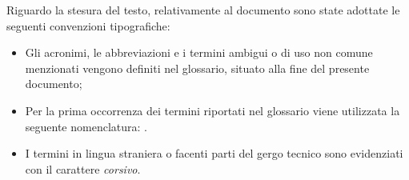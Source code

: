 


Riguardo la stesura del testo, relativamente al documento sono state adottate le seguenti convenzioni tipografiche:
\begin{itemize}
	\item Gli acronimi, le abbreviazioni e i termini ambigui o di uso non comune menzionati vengono definiti nel glossario, situato alla fine del presente documento;
	\item Per la prima occorrenza dei termini riportati nel glossario viene utilizzata la seguente nomenclatura: .
	\item I termini in lingua straniera o facenti parti del gergo tecnico sono evidenziati con il carattere \emph{corsivo}.
\end{itemize}

